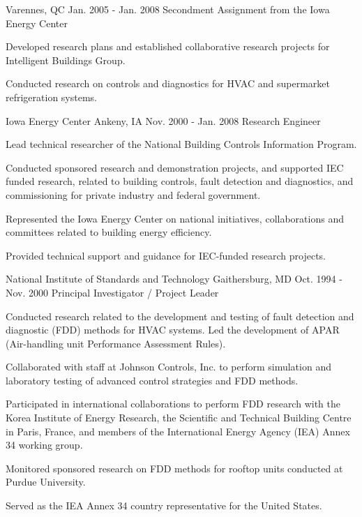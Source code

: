 \begin{cventries}
{Varennes, QC} %
{Jan. 2005 - Jan. 2008} %
{Secondment Assignment from the Iowa Energy Center} %
{
\begin{cvitems} %
\item {Developed research plans and established collaborative research projects for Intelligent Buildings Group.}
\item {Conducted research on controls and diagnostics for HVAC and supermarket refrigeration systems.}
\end{cvitems}
}
\cventry
{Iowa Energy Center} %
{Ankeny, IA} %
{Nov. 2000 - Jan. 2008} %
{Research Engineer} %
{
\begin{cvitems} %
\item {Lead technical researcher of the National Building Controls Information Program.}
\item {Conducted sponsored research and demonstration projects, and supported IEC funded research, related to building controls, fault detection and diagnostics, and commissioning for private industry and federal government.}
\item {Represented the Iowa Energy Center on national initiatives, collaborations and committees related to building energy efficiency.}
\item {Provided technical support and guidance for IEC-funded research projects.}
\end{cvitems}
}%
\cventry
{National Institute of Standards and Technology} %
{Gaithersburg, MD} %
{Oct. 1994 - Nov. 2000} %
{Principal Investigator / Project Leader} %
{
\begin{cvitems} %
\item {Conducted research related to the development and testing of fault detection and diagnostic (FDD) methods for HVAC systems. Led the development of APAR (Air-handling unit Performance Assessment Rules).}
\item {Collaborated with staff at Johnson Controls, Inc. to perform simulation and laboratory testing of advanced control strategies and FDD methods.}
\item {Participated in international collaborations to perform FDD research with the Korea Institute of Energy Research, the Scientific and Technical Building Centre in Paris, France, and members of the International Energy Agency (IEA) Annex 34 working group.}
\item {Monitored sponsored research on FDD methods for rooftop units conducted at Purdue University.}
\item {Served as the IEA Annex 34 country representative for the United States.}
\end{cvitems}
}
\end{cventries}

